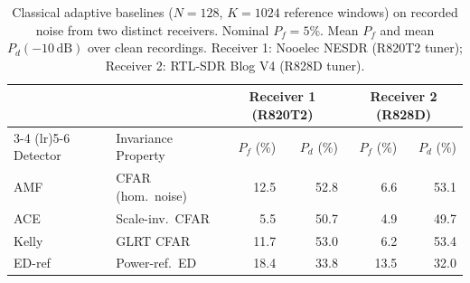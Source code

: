 \begin{table}[t]
\centering
\caption{Classical adaptive baselines ($N=128$, $K=1024$ reference windows) on recorded noise from two distinct receivers. Nominal $P_f=5\%$. Mean $P_f$ and mean $P_d(-10\,\mathrm{dB})$ over clean recordings. Receiver 1: Nooelec NESDR (R820T2 tuner); Receiver 2: RTL-SDR Blog V4 (R828D tuner).}
\label{tab:adaptive}
\footnotesize
\setlength{\tabcolsep}{2.2pt}
\begin{tabular}{llrrrr}
\toprule
& & \multicolumn{2}{c}{Receiver 1 (R820T2)} & \multicolumn{2}{c}{Receiver 2 (R828D)} \\
\cmidrule(lr){3-4} \cmidrule(lr){5-6}
Detector & Invariance Property & $P_f$ (\%) & $P_d$ (\%) & $P_f$ (\%) & $P_d$ (\%) \\
\midrule
AMF~\cite{robey1992amf} & CFAR (hom.~noise) & 12.5 & 52.8 & 6.6 & 53.1 \\
ACE~\cite{kraut2001ace} & Scale-inv.~CFAR & 5.5 & 50.7 & 4.9 & 49.7 \\
Kelly~\cite{kelly1986adaptive} & GLRT CFAR & 11.7 & 53.0 & 6.2 & 53.4 \\
ED-ref & Power-ref.~ED & 18.4 & 33.8 & 13.5 & 32.0 \\
\bottomrule
\end{tabular}
\end{table}
